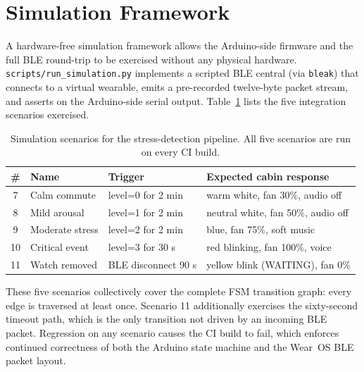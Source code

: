 \section{Simulation Framework}
\label{sec:impl-simulation}

A hardware-free simulation framework allows the Arduino-side firmware
and the full BLE round-trip to be exercised without any physical
hardware. \texttt{scripts/run\_simulation.py} implements a scripted
BLE central (via \texttt{bleak}) that connects to a virtual wearable,
emits a pre-recorded twelve-byte packet stream, and asserts on the
Arduino-side serial output. Table~\ref{tab:scenarios} lists the five
integration scenarios exercised.

\begin{table}[H]
\centering
\caption{Simulation scenarios for the stress-detection pipeline. All
five scenarios are run on every CI build.}
\label{tab:scenarios}
\small
\begin{tabular}{cllp{5cm}}
\toprule
\textbf{\#} & \textbf{Name} & \textbf{Trigger} & \textbf{Expected cabin
response} \\
\midrule
7  & Calm commute    & level=0 for 2 min   & warm white, fan 30\%, audio off \\
8  & Mild arousal    & level=1 for 2 min   & neutral white, fan 50\%, audio off \\
9  & Moderate stress & level=2 for 2 min   & blue, fan 75\%, soft music \\
10 & Critical event  & level=3 for 30 s    & red blinking, fan 100\%, voice \\
11 & Watch removed   & BLE disconnect 90 s & yellow blink (WAITING), fan 0\% \\
\bottomrule
\end{tabular}
\end{table}

These five scenarios collectively cover the complete FSM transition
graph: every edge is traversed at least once. Scenario 11 additionally
exercises the sixty-second timeout path, which is the only transition
not driven by an incoming BLE packet. Regression on any scenario causes
the CI build to fail, which enforces continued correctness of both
the Arduino state machine and the Wear~OS BLE packet layout.
